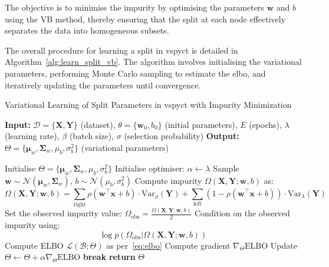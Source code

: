 \documentclass[3p,review,authoryear]{elsarticle}
\begin{document}
The objective is to minimise the impurity by optimising the parameters \(\mathbf{w}\) and \(b\) using the VB method, thereby ensuring that the split at each node effectively separates the data into homogeneous subsets.

The overall procedure for learning a split in \gls{vspyct} is detailed in Algorithm~\ref{alg:learn_split_vb}.
The algorithm involves initialising the variational parameters, performing Monte Carlo sampling to estimate the \gls{elbo}, and iteratively updating the parameters until convergence.

\begin{algorithm}[h!]
\caption{Variational Learning of Split Parameters in \gls{vspyct} with Impurity Minimization}
\label{alg:learn_split_vb}
\begin{algorithmic}[1]
    \State \textbf{Input:} $\mathcal{D} = \{\mathbf{X}, \mathbf{Y}\}$ (dataset), $\theta = \{\mathbf{w}_0, b_0\}$ (initial parameters), $E$ (epochs), $\lambda$ (learning rate), $\beta$ (batch size), $\sigma$ (selection probability)
    \State \textbf{Output:} $\Theta = \{\boldsymbol{\mu}_w, \boldsymbol{\Sigma}_w, \mu_b, \sigma_b^2\}$ (variational parameters)
 
        \State Initialise $\Theta = \{\boldsymbol{\mu}_w, \boldsymbol{\Sigma}_w, \mu_b, \sigma_b^2\}$ 
        \State Initialise optimiser: $\alpha \gets \lambda$
         
                \State Sample $\mathbf{w} \sim \mathcal{N}(\boldsymbol{\mu}_w, \boldsymbol{\Sigma}_w)$, $b \sim \mathcal{N}(\mu_b, \sigma_b^2)$
                \State Compute impurity $\Omega(\mathbf{X}, \mathbf{Y}; \mathbf{w}, b)$ as:
                \[
                \Omega(\mathbf{X}, \mathbf{Y}; \mathbf{w}, b) = \sum_{\text{right}} \rho(\mathbf{w}^\top \mathbf{x} + b) \cdot \text{Var}_\rho(\mathbf{Y}) + \sum_{\text{left}} (1 - \rho(\mathbf{w}^\top \mathbf{x} + b)) \cdot \text{Var}_\lambda(\mathbf{Y})
                \]
                \State Set the observed impurity value: $\Omega_\text{obs} = \frac{\Omega(\mathbf{X}, \mathbf{Y}; \mathbf{w}, b)}{2}$
                \State Condition on the observed impurity using:
                \[
                \log p(\Omega_\text{obs}|\Omega(\mathbf{X}, \mathbf{Y}; \mathbf{w}, b))
                \]
                \State Compute ELBO $\mathcal{L}(\mathcal{B}; \Theta)$ as per~\eqref{eq:elbo}
                \State Compute gradient $\nabla_{\Theta} \text{ELBO}$
                \State Update $\Theta \gets \Theta + \alpha \nabla_{\Theta} \text{ELBO}$ 
            \EndFor
                \State \textbf{break}
            \EndIf
        \EndFor
        \State \textbf{return} $\Theta$
    \EndProcedure
\end{algorithmic}
\end{algorithm}
\end{document}
